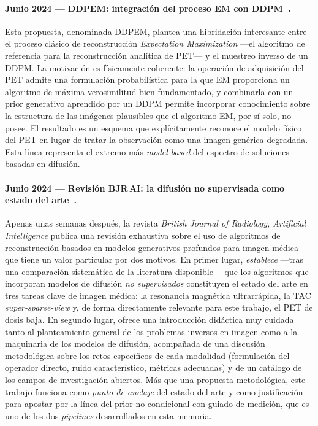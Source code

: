 \paragraph{Junio 2024 — DDPEM: integración del proceso EM con
DDPM~\cite{ddpem2024}.} Esta propuesta, denominada DDPEM, plantea
una hibridación interesante entre el proceso clásico de
reconstrucción \emph{Expectation Maximization} —el algoritmo de
referencia para la reconstrucción analítica de PET— y el muestreo
inverso de un DDPM. La motivación es físicamente coherente: la
operación de adquisición del PET admite una formulación
probabilística para la que EM proporciona un algoritmo de máxima
verosimilitud bien fundamentado, y combinarla con un prior
generativo aprendido por un DDPM permite incorporar conocimiento
sobre la estructura de las imágenes plausibles que el algoritmo
EM, por sí solo, no posee. El resultado es un esquema que
explícitamente reconoce el modelo físico del PET en lugar de
tratar la observación como una imagen genérica degradada. Esta
línea representa el extremo más \emph{model-based} del espectro
de soluciones basadas en difusión.

\paragraph{Junio 2024 — Revisión BJR\,AI: la difusión no supervisada
como estado del arte~\cite{bjrai2024}.} Apenas unas semanas
después, la revista \emph{British Journal of Radiology, Artificial
Intelligence} publica una revisión exhaustiva sobre el uso de
algoritmos de reconstrucción basados en modelos generativos
profundos para imagen médica que tiene un valor particular por dos
motivos. En primer lugar, \emph{establece} —tras una comparación
sistemática de la literatura disponible— que los algoritmos que
incorporan modelos de difusión \emph{no supervisados} constituyen
el estado del arte en tres tareas clave de imagen médica: la
resonancia magnética ultrarrápida, la TAC \textit{super-sparse-view}
y, de forma directamente relevante para este trabajo, el PET de
dosis baja. En segundo lugar, ofrece una introducción didáctica
muy cuidada tanto al planteamiento general de los problemas
inversos en imagen como a la maquinaria de los modelos de difusión,
acompañada de una discusión metodológica sobre los retos
específicos de cada modalidad (formulación del operador directo,
ruido característico, métricas adecuadas) y de un catálogo de los
campos de investigación abiertos. Más que una propuesta
metodológica, este trabajo funciona como \emph{punto de anclaje}
del estado del arte y como justificación para apostar por la línea
del prior no condicional con guiado de medición, que es uno de los
dos \textit{pipelines} desarrollados en esta memoria.

